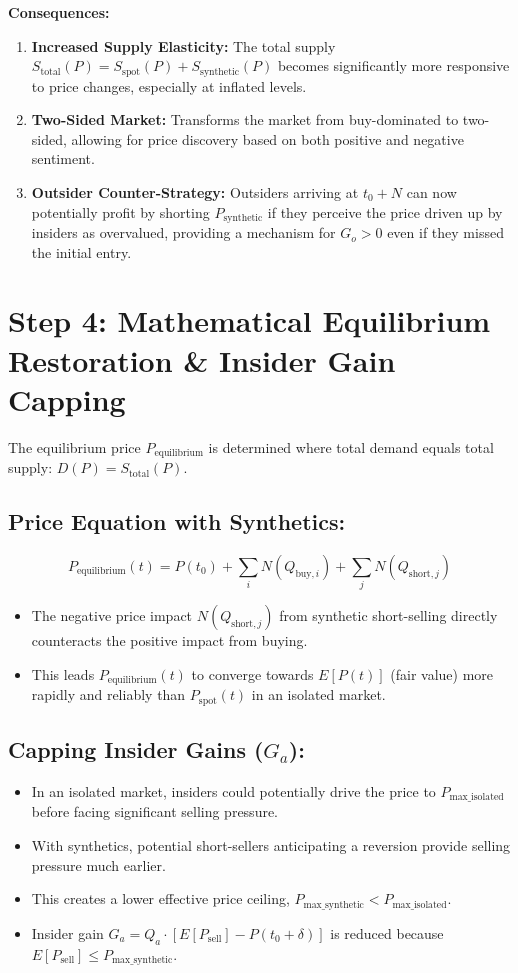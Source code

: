 \documentclass{article}
\begin{document}
\textbf{Consequences:}
\begin{enumerate}
    \item \textbf{Increased Supply Elasticity:} The total supply $S_{\text{total}}(P) = S_{\text{spot}}(P) + S_{\text{synthetic}}(P)$ becomes significantly more responsive to price changes, especially at inflated levels.
    \item \textbf{Two-Sided Market:} Transforms the market from buy-dominated to two-sided, allowing for price discovery based on both positive and negative sentiment.
    \item \textbf{Outsider Counter-Strategy:} Outsiders arriving at $t_0 + N$ can now potentially profit by shorting $P_{\text{synthetic}}$ if they perceive the price driven up by insiders as overvalued, providing a mechanism for $G_o > 0$ even if they missed the initial entry.
\end{enumerate}

\section{Step 4: Mathematical Equilibrium Restoration & Insider Gain Capping}

The equilibrium price $P_{\text{equilibrium}}$ is determined where total demand equals total supply: $D(P) = S_{\text{total}}(P)$.

\subsection*{Price Equation with Synthetics:}
\[
P_{\text{equilibrium}}(t) = P(t_0) + \sum_{i} N(Q_{\text{buy},i}) + \sum_{j} N(Q_{\text{short},j})
\]
\begin{itemize}
    \item The negative price impact $N(Q_{\text{short},j})$ from synthetic short-selling directly counteracts the positive impact from buying.
    \item This leads $P_{\text{equilibrium}}(t)$ to converge towards $E[P(t)]$ (fair value) more rapidly and reliably than $P_{\text{spot}}(t)$ in an isolated market.
\end{itemize}

\subsection*{Capping Insider Gains ($G_a$):}
\begin{itemize}
    \item In an isolated market, insiders could potentially drive the price to $P_{\text{max\_isolated}}$ before facing significant selling pressure.
    \item With synthetics, potential short-sellers anticipating a reversion provide selling pressure much earlier.
    \item This creates a lower effective price ceiling, $P_{\text{max\_synthetic}} < P_{\text{max\_isolated}}$.
    \item Insider gain $G_a = Q_a \cdot [E[P_{\text{sell}}] - P(t_0+\delta)]$ is reduced because $E[P_{\text{sell}}] \le P_{\text{max\_synthetic}}$.
\end{itemize}
\end{document}
